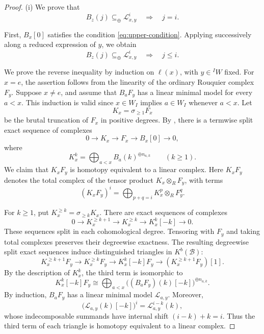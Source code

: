 \documentclass[11pt,a4paper]{article}
\numberwithin{equation}{section}
\theoremstyle{remark}
\newcommand{\LL}{\mathcal L}
\newcommand{\summand}{\mathrel{\subseteq_{\oplus}}}
\begin{document}
\begin{proof}
	(i) We prove that
	\[
	B_z(j)\summand\LL_{x,y}^i
	\quad\Longrightarrow\quad j=i.
	\]
	
	First, $B_x[0]$ satisfies the condition
	\eqref{eq:upper-condition}.
	Applying \cite[Lemma 6.6]{EW} successively
	along a reduced expression of $y$, we obtain
	\begin{equation}\label{eq:upper}
		B_z(j)\summand\LL_{x,y}^i
		\quad\Longrightarrow\quad j\le i.
	\end{equation}
	
	We prove the reverse inequality by induction
	on $\ell(x)$, with $y\in{}^I W$ fixed.
	For $x=e$, the assertion follows from the
	linearity of the ordinary Rouquier complex $F_y$.
	Suppose $x\ne e$, and assume that $B_aF_y$
	has a linear minimal model for every $a<x$.
	This induction is valid since $x\in W_I$
	implies $a\in W_I$ whenever $a<x$.
	Let
	\[
	K_x=\sigma_{\ge1}F_x
	\]
	be the brutal truncation of $F_x$ in positive
	degrees. By \cite[Theorem 6.9]{EW}, there is a
	termwise split exact sequence of complexes
	\begin{equation}\label{eq:truncation}
		0\longrightarrow K_x
		\longrightarrow F_x
		\longrightarrow B_x[0]
		\longrightarrow0,
	\end{equation}
	where
	\[
	K_x^k=
	\bigoplus_{a<x}B_a(k)^{\oplus n_{a,k}}
	\qquad(k\ge1).
	\]
	We claim that $K_xF_y$ is homotopy equivalent
	to a linear complex. Here $K_xF_y$ denotes
	the total complex of the tensor product
	$K_x\otimes_R F_y$, with terms
	\[
	(K_xF_y)^i=
	\bigoplus_{p+q=i}K_x^p\otimes_R F_y^q.
	\]
	

	
	For \(k\ge1\), put \(K_x^{\ge k}=\sigma_{\ge k}K_x\). There are exact sequences of complexes
	\[
	0\longrightarrow K_x^{\ge k+1}
	\longrightarrow K_x^{\ge k}
	\longrightarrow K_x^k[-k]
	\longrightarrow0.
	\]
	These sequences split in each cohomological degree. Tensoring with \(F_y\) and taking total complexes preserves their degreewise exactness. The resulting degreewise split exact sequences induce distinguished triangles in \(K^b(\mathcal B)\):
	\[
	K_x^{\ge k+1}F_y
	\longrightarrow K_x^{\ge k}F_y
	\longrightarrow K_x^k[-k]F_y
	\longrightarrow (K_x^{\ge k+1}F_y)[1].
	\]
	By the description of $K_x^k$, the third term
	is isomorphic to
	\[
	K_x^k[-k]F_y
	\cong
	\bigoplus_{a<x}
	\bigl((B_aF_y)(k)[-k]\bigr)^{\oplus n_{a,k}}.
	\]
	By induction, $B_aF_y$ has a linear minimal
	model $\LL_{a,y}$. Moreover,
	\[
	\bigl(\LL_{a,y}(k)[-k]\bigr)^i
	=\LL_{a,y}^{i-k}(k),
	\]
	whose indecomposable summands have internal
	shift $(i-k)+k=i$.
	Thus the third term of each triangle is
	homotopy equivalent to a linear complex.
	

\end{proof}
\end{document}
